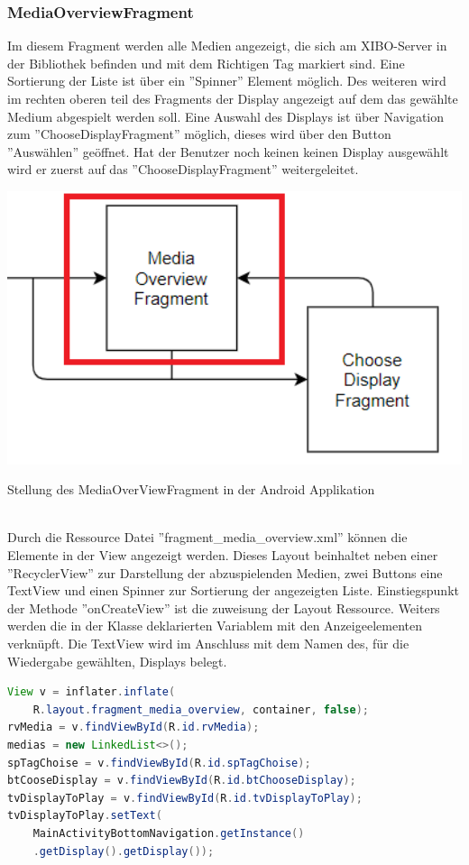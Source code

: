 \subsubsection{MediaOverviewFragment}
Im diesem Fragment werden alle Medien angezeigt, die sich am XIBO-Server in der Bibliothek befinden und mit dem Richtigen Tag markiert sind. Eine Sortierung der Liste ist über ein ''Spinner'' Element möglich. Des weiteren wird im rechten oberen teil des Fragments der Display angezeigt auf dem das gewählte Medium abgespielt werden soll. Eine Auswahl des Displays ist über Navigation zum ''ChooseDisplayFragment'' möglich, dieses wird über den Button ''Auswählen'' geöffnet. Hat der Benutzer noch keinen keinen Display ausgewählt wird er zuerst auf das ''ChooseDisplayFragment'' weitergeleitet.
\\
\begin{mediaNav}
\centering
\includegraphics[width=1.0\textwidth]{images/06_AndroidApp/06_MediaOverViewStellung}
\caption{Stellung des MediaOverViewFragment in der Android Applikation}
\label{fig:mediaNav}
\end{mediaNav}
\\
Durch die Ressource Datei ''fragment\_media\_overview.xml'' können die Elemente in der View angezeigt werden. Dieses Layout beinhaltet neben einer ''RecyclerView'' zur Darstellung der abzuspielenden Medien, zwei Buttons eine TextView und einen Spinner zur Sortierung der angezeigten Liste. Einstiegspunkt der Methode ''onCreateView'' ist die zuweisung der Layout Ressource. Weiters werden die in der Klasse deklarierten Variablem mit den Anzeigeelementen verknüpft. Die TextView wird im Anschluss mit dem Namen des, für die Wiedergabe gewählten, Displays belegt.
\begin{lstlisting}[language=Java,caption={Instantiieren der benötigten Variablen im MediaOverviewFragment}]
View v = inflater.inflate(
	R.layout.fragment_media_overview, container, false);
rvMedia = v.findViewById(R.id.rvMedia);
medias = new LinkedList<>();
spTagChoise = v.findViewById(R.id.spTagChoise);
btCooseDisplay = v.findViewById(R.id.btChooseDisplay);
tvDisplayToPlay = v.findViewById(R.id.tvDisplayToPlay);
tvDisplayToPlay.setText(
	MainActivityBottomNavigation.getInstance()
	.getDisplay().getDisplay()); 
\end{lstlisting}
